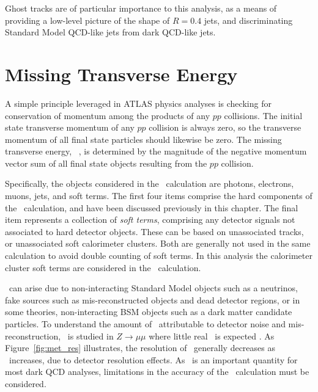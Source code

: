 Ghost tracks are of particular importance to this analysis, as a means of providing a low-level picture of the shape of $R=0.4$ jets, and discriminating Standard Model QCD-like jets from dark QCD-like jets. 

\section{Missing Transverse Energy}
A simple principle leveraged in ATLAS physics analyses is checking for conservation of momentum among the products of any $pp$ collisions. The initial state transverse momentum of any $pp$ collision is always zero, so the transverse momentum of all final state particles should likewise be zero. The missing transverse energy, \met~, is determined by the magnitude of the negative momentum vector sum of all final state objects resulting from the $pp$ collision. \par

Specifically, the objects considered in the \met~calculation are photons, electrons, muons, jets, and soft terms. The first four items comprise the hard components of the \met~calculation, and have been discussed previously in this chapter. The final item represents a collection of \textit{soft terms}, comprising any detector signals not associated to hard detector objects. These can be based on unassociated tracks, or unassociated soft calorimeter clusters. Both are generally not used in the same calculation to avoid double counting of soft terms. In this analysis the calorimeter cluster soft terms are considered in the \met~calculation. \par

\met~can arise due to non-interacting Standard Model objects such as a neutrinos, fake sources such as mis-reconstructed objects and dead detector regions, or in some theories, non-interacting BSM objects such as a dark matter candidate particles. To understand the amount of \met~attributable to detector noise and mis-reconstruction, \met~is studied in $Z\rightarrow \mu\mu$ where little real \met~is expected \cite{met_res}. As Figure~\ref{fig:met_res} illustrates, the resolution of \met~generally decreases as \met~increases, due to detector resolution effects. As \met~is an important quantity for most dark QCD analyses, limitations in the accuracy of the \met~calculation must be considered.


